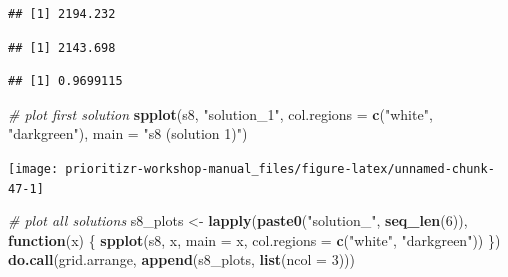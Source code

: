 \documentclass[12pt,]{book}
\newenvironment{Shaded}{\begin{snugshade}}{\end{snugshade}}
\newcommand{\KeywordTok}[1]{\textcolor[rgb]{0.13,0.29,0.53}{\textbf{#1}}}
\newcommand{\DataTypeTok}[1]{\textcolor[rgb]{0.13,0.29,0.53}{#1}}
\newcommand{\DecValTok}[1]{\textcolor[rgb]{0.00,0.00,0.81}{#1}}
\newcommand{\StringTok}[1]{\textcolor[rgb]{0.31,0.60,0.02}{#1}}
\newcommand{\CommentTok}[1]{\textcolor[rgb]{0.56,0.35,0.01}{\textit{#1}}}
\newcommand{\ControlFlowTok}[1]{\textcolor[rgb]{0.13,0.29,0.53}{\textbf{#1}}}
\newcommand{\OperatorTok}[1]{\textcolor[rgb]{0.81,0.36,0.00}{\textbf{#1}}}
\newcommand{\NormalTok}[1]{#1}
\begin{document}
\begin{verbatim}
## [1] 2194.232
\end{verbatim}

\begin{Shaded}
\end{Shaded}

\begin{verbatim}
## [1] 2143.698
\end{verbatim}

\begin{Shaded}
\end{Shaded}

\begin{verbatim}
## [1] 0.9699115
\end{verbatim}

\begin{Shaded}
\begin{Highlighting}[]
\CommentTok{# plot first solution}
\KeywordTok{spplot}\NormalTok{(s8, }\StringTok{"solution_1"}\NormalTok{, }\DataTypeTok{col.regions =} \KeywordTok{c}\NormalTok{(}\StringTok{"white"}\NormalTok{, }\StringTok{"darkgreen"}\NormalTok{),}
       \DataTypeTok{main =} \StringTok{"s8 (solution 1)"}\NormalTok{)}
\end{Highlighting}
\end{Shaded}

\begin{center}\texttt{[image: prioritizr-workshop-manual\_files/figure-latex/unnamed-chunk-47-1]} \end{center}

\clearpage

\begin{Shaded}
\begin{Highlighting}[]
\CommentTok{# plot all solutions}
\NormalTok{s8_plots <-}\StringTok{ }\KeywordTok{lapply}\NormalTok{(}\KeywordTok{paste0}\NormalTok{(}\StringTok{"solution_"}\NormalTok{, }\KeywordTok{seq_len}\NormalTok{(}\DecValTok{6}\NormalTok{)), }\ControlFlowTok{function}\NormalTok{(x) \{}
  \KeywordTok{spplot}\NormalTok{(s8, x, }\DataTypeTok{main =}\NormalTok{ x, }\DataTypeTok{col.regions =} \KeywordTok{c}\NormalTok{(}\StringTok{"white"}\NormalTok{, }\StringTok{"darkgreen"}\NormalTok{))}
\NormalTok{\})}
\KeywordTok{do.call}\NormalTok{(grid.arrange, }\KeywordTok{append}\NormalTok{(s8_plots, }\KeywordTok{list}\NormalTok{(}\DataTypeTok{ncol =} \DecValTok{3}\NormalTok{)))}
\end{Highlighting}
\end{Shaded}
\end{document}
